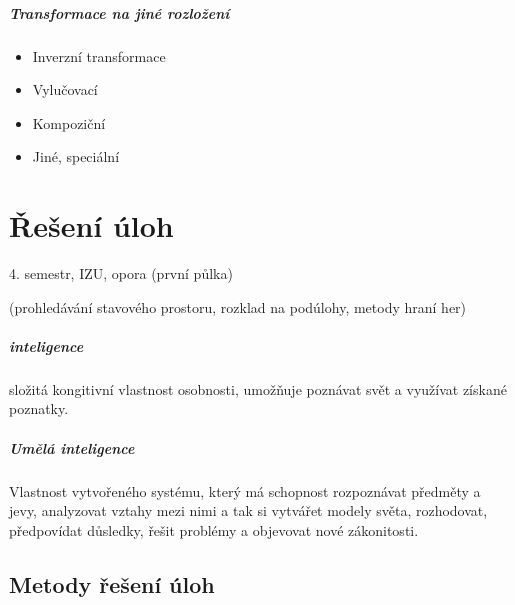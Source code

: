 \documentclass[a4paper, 11pt]{report}
\begin{document}
\paragraph{Transformace na jiné rozložení}
\begin{itemize}
	\item Inverzní transformace
	\item Vylučovací
	\item Kompoziční
	\item Jiné, speciální
\end{itemize}






























\chapter{Řešení úloh} \label{cha:24}

4. semestr, IZU, opora (první půlka)

(prohledávání stavového prostoru, rozklad na podúlohy, metody hraní her)

\paragraph{inteligence} složitá kongitivní vlastnost osobnosti, umožňuje poznávat svět a využívat získané poznatky.

\paragraph{Umělá inteligence}

Vlastnost vytvořeného systému, který má schopnost rozpoznávat předměty a jevy, analyzovat vztahy mezi nimi a tak si vytvářet modely světa, rozhodovat, předpovídat důsledky, řešit problémy a objevovat nové zákonitosti.

\section{Metody řešení úloh}
\end{document}
